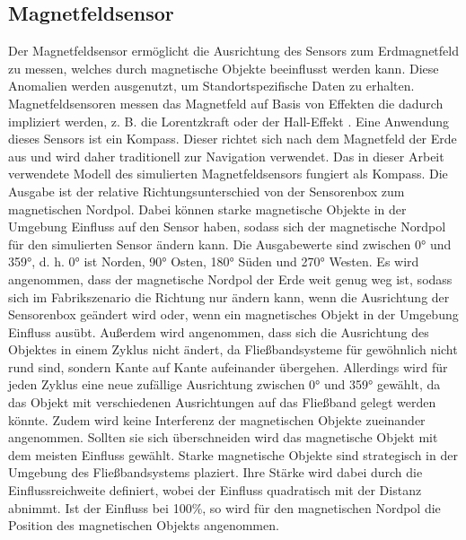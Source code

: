 \subsection{Magnetfeldsensor}
Der Magnetfeldsensor ermöglicht die Ausrichtung des Sensors zum Erdmagnetfeld zu messen, welches durch magnetische Objekte beeinflusst werden kann.
Diese Anomalien werden ausgenutzt, um Standortspezifische Daten zu erhalten.
Magnetfeldsensoren messen das Magnetfeld auf Basis von Effekten die dadurch impliziert werden, z. B. die Lorentzkraft oder der Hall-Effekt \cite{thompsonMEMS}.
Eine Anwendung dieses Sensors ist ein Kompass.
Dieser richtet sich nach dem Magnetfeld der Erde aus und wird daher traditionell zur Navigation verwendet.
\newline
\newline
Das in dieser Arbeit verwendete Modell des simulierten Magnetfeldsensors fungiert als Kompass.
Die Ausgabe ist der relative Richtungsunterschied von der Sensorenbox zum magnetischen Nordpol.
Dabei können starke magnetische Objekte in der Umgebung Einfluss auf den Sensor haben,
sodass sich der magnetische Nordpol für den simulierten Sensor ändern kann.
Die Ausgabewerte sind zwischen 0° und 359°, d. h. 0° ist Norden, 90° Osten, 180° Süden und 270° Westen.
\newline
\newline
Es wird angenommen, dass der magnetische Nordpol der Erde weit genug weg ist,
sodass sich im Fabrikszenario die Richtung nur ändern kann, wenn die Ausrichtung der Sensorenbox geändert wird
oder, wenn ein magnetisches Objekt in der Umgebung Einfluss ausübt.
Außerdem wird angenommen, dass sich die Ausrichtung des Objektes in einem Zyklus nicht ändert,
da Fließbandsysteme für gewöhnlich nicht rund sind, sondern Kante auf Kante aufeinander übergehen.
Allerdings wird für jeden Zyklus eine neue zufällige Ausrichtung zwischen 0° und 359° gewählt,
da das Objekt mit verschiedenen Ausrichtungen auf das Fließband gelegt werden könnte.
Zudem wird keine Interferenz der magnetischen Objekte zueinander angenommen.
Sollten sie sich überschneiden wird das magnetische Objekt mit dem meisten Einfluss gewählt.
\newline
\newline
Starke magnetische Objekte sind strategisch in der Umgebung des Fließbandsystems plaziert.
Ihre Stärke wird dabei durch die Einflussreichweite definiert, wobei der Einfluss quadratisch mit der Distanz abnimmt.
Ist der Einfluss bei 100\%, so wird für den magnetischen Nordpol die Position des magnetischen Objekts angenommen.
